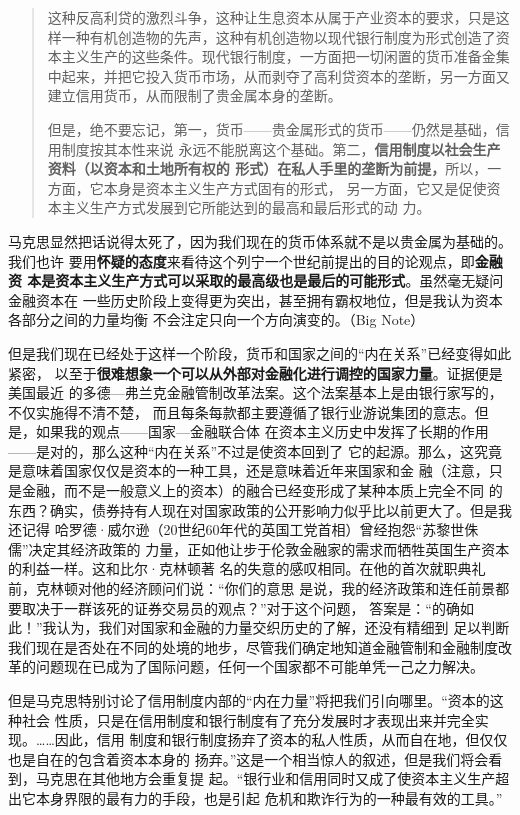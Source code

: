 \begin{quotation}
这种反高利贷的激烈斗争，这种让生息资本从属于产业资本的要求，只是这样一种有机创造物的先声，这种有机创造物以现代银行制度为形式创造了资本主义生产的这些条件。现代银行制度，一方面把一切闲置的货币准备金集中起来，并把它投入货币市场，从而剥夺了高利贷资本的垄断，另一方面又建立信用货币，从而限制了贵金属本身的垄断。 

但是，绝不要忘记，第一，货币——贵金属形式的货币——仍然是基础，信用制度按其本性来说
永远不能脱离这个基础。第二，\textbf{信用制度以社会生产资料（以资本和土地所有权的
  形式）在私人手里的垄断为前提，}所以，一方面，它本身是资本主义生产方式固有的形式，
另一方面，它又是促使资本主义生产方式发展到它所能达到的最高和最后形式的动
力。

\end{quotation}

马克思显然把话说得太死了，因为我们现在的货币体系就不是以贵金属为基础的。我们也许
要用\textbf{怀疑的态度}来看待这个列宁一个世纪前提出的目的论观点，即\textbf{金融资
  本是资本主义生产方式可以采取的最高级也是最后的可能形式}。虽然毫无疑问金融资本在
一些历史阶段上变得更为突出，甚至拥有霸权地位，但是我认为资本各部分之间的力量均衡
不会注定只向一个方向演变的。（Big Note）

但是我们现在已经处于这样一个阶段，货币和国家之间的“内在关系”已经变得如此紧密，
以至于\textbf{很难想象一个可以从外部对金融化进行调控的国家力量}。证据便是美国最近
的多德—弗兰克金融管制改革法案。这个法案基本上是由银行家写的，不仅实施得不清不楚，
而且每条每款都主要遵循了银行业游说集团的意志。但是，如果我的观点——国家—金融联合体
在资本主义历史中发挥了长期的作用——是对的，那么这种“内在关系”不过是使资本回到了
它的起源。那么，这究竟是意味着国家仅仅是资本的一种工具，还是意味着近年来国家和金
融（注意，只是金融，而不是一般意义上的资本）的融合已经变形成了某种本质上完全不同
的东西？确实，债券持有人现在对国家政策的公开影响力似乎比以前更大了。但是我还记得
哈罗德·威尔逊（20世纪60年代的英国工党首相）曾经抱怨“苏黎世侏儒”决定其经济政策的
力量，正如他让步于伦敦金融家的需求而牺牲英国生产资本的利益一样。这和比尔·克林顿著
名的失意的感叹相同。在他的首次就职典礼前，克林顿对他的经济顾问们说：“你们的意思
是说，我的经济政策和连任前景都要取决于一群该死的证券交易员的观点？”对于这个问题，
答案是：“的确如此！”我认为，我们对国家和金融的力量交织历史的了解，还没有精细到
足以判断我们现在是否处在不同的处境的地步，尽管我们确定地知道金融管制和金融制度改
革的问题现在已成为了国际问题，任何一个国家都不可能单凭一己之力解决。

但是马克思特别讨论了信用制度内部的“内在力量”将把我们引向哪里。“资本的这种社会
性质，只是在信用制度和银行制度有了充分发展时才表现出来并完全实现。……因此，信用
制度和银行制度扬弃了资本的私人性质，从而自在地，但仅仅也是自在的包含着资本本身的
扬弃。”这是一个相当惊人的叙述，但是我们将会看到，马克思在其他地方会重复提
起。“银行业和信用同时又成了使资本主义生产超出它本身界限的最有力的手段，也是引起
危机和欺诈行为的一种最有效的工具。”

